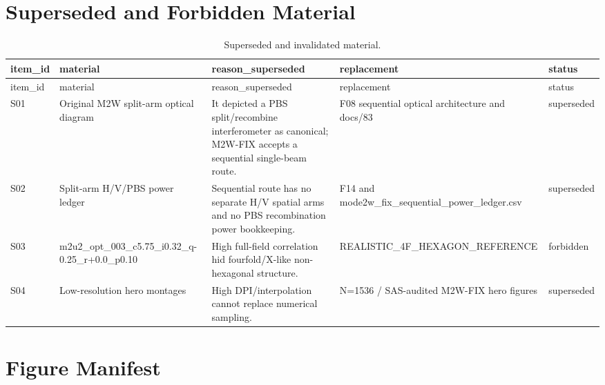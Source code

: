 \documentclass[11pt,a4paper]{report}
\begin{document}
\chapter{Superseded and Forbidden Material}

\begin{longtable}{p{}p{}p{}p{}p{}}
\caption{Superseded and invalidated material.}\label{tab:superseded}\\
\toprule
item\_id & material & reason\_superseded & replacement & status\\
\midrule
\endfirsthead
\toprule
item\_id & material & reason\_superseded & replacement & status\\
\midrule
\endhead
S01 & Original M2W split-arm optical diagram & It depicted a PBS split/recombine interferometer as canonical; M2W-FIX accepts a sequential single-beam route. & F08 sequential optical architecture and docs/83 & superseded\\
S02 & Split-arm H/V/PBS power ledger & Sequential route has no separate H/V spatial arms and no PBS recombination power bookkeeping. & F14 and mode2w\_fix\_sequential\_power\_ledger.csv & superseded\\
S03 & m2u2\_opt\_003\_c5.75\_i0.32\_q-0.25\_r+0.0\_p0.10 & High full-field correlation hid fourfold/X-like non-hexagonal structure. & REALISTIC\_4F\_HEXAGON\_REFERENCE & forbidden\\
S04 & Low-resolution hero montages & High DPI/interpolation cannot replace numerical sampling. & N=1536 / SAS-audited M2W-FIX hero figures & superseded\\
\bottomrule
\end{longtable}

\chapter{Figure Manifest}
\end{document}
